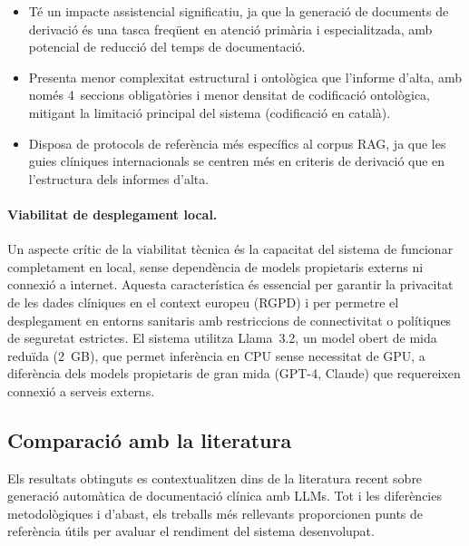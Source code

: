 \documentclass[CAT]{TFUOC}%
\begin{document}
\begin{itemize}
    \item Té un impacte assistencial significatiu, ja que la generació de documents de derivació és una tasca freqüent en atenció primària i especialitzada, amb potencial de reducció del temps de documentació.
    
    \item Presenta menor complexitat estructural i ontològica que l'informe d'alta, amb només 4~seccions obligatòries i menor densitat de codificació ontològica, mitigant la limitació principal del sistema (codificació en català).
    
    \item Disposa de protocols de referència més específics al corpus RAG, ja que les guies clíniques internacionals se centren més en criteris de derivació que en l'estructura dels informes d'alta.
\end{itemize}

\paragraph{Viabilitat de desplegament local.}
Un aspecte crític de la viabilitat tècnica és la capacitat del sistema de funcionar completament en local, sense dependència de models propietaris externs ni connexió a internet. Aquesta característica és essencial per garantir la privacitat de les dades clíniques en el context europeu (RGPD) i per permetre el desplegament en entorns sanitaris amb restriccions de connectivitat o polítiques de seguretat estrictes. El sistema utilitza Llama~3.2, un model obert de mida reduïda (2~GB), que permet inferència en CPU sense necessitat de GPU, a diferència dels models propietaris de gran mida (GPT-4, Claude) que requereixen connexió a serveis externs.

\subsection{Comparació amb la literatura}

Els resultats obtinguts es contextualitzen dins de la literatura recent sobre generació automàtica de documentació clínica amb LLMs. Tot i les diferències metodològiques i d'abast, els treballs més rellevants proporcionen punts de referència útils per avaluar el rendiment del sistema desenvolupat.
\end{document}
